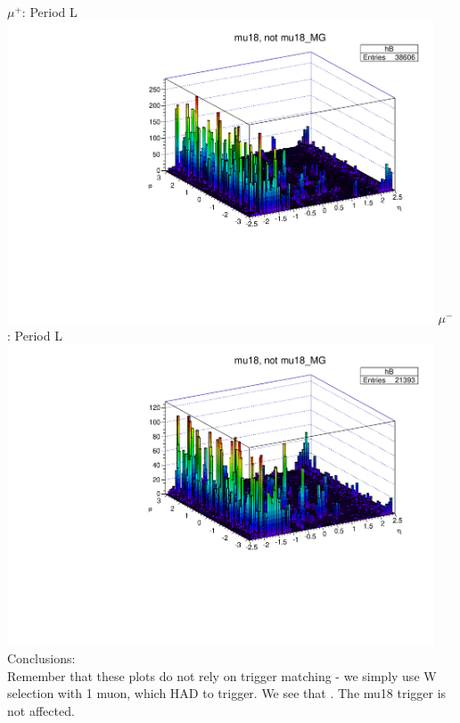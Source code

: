  {
\colb[T]
$\mu^+$: Period L
\centering
\includegraphics[width=0.95\textwidth]{dates/20130306/figures/mu18/dump_MG_dataL_w_POS.dat__MUID_NOT_MG}
$\mu^-$: Period L
\centering
\includegraphics[width=0.95\textwidth]{dates/20130306/figures/mu18/dump_MG_dataL_w_NEG.dat__MUID_NOT_MG}
\cole
}
 {
  Conclusions: \\
  Remember that these plots do not rely on trigger matching - we simply use W selection with 1 muon, which HAD to trigger.
  We see that . The mu18 trigger is not affected.
}

